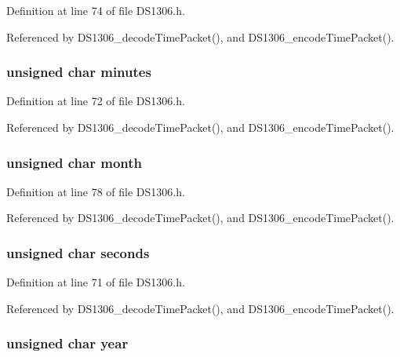 Definition at line 74 of file D\-S1306.\-h.



Referenced by D\-S1306\-\_\-decode\-Time\-Packet(), and D\-S1306\-\_\-encode\-Time\-Packet().

\hypertarget{structds1306time_acf4ceb0d1cb80a37559ed7fd414cd389}{
\subsubsection[{minutes}]{\setlength{\rightskip}{0pt plus 5cm}unsigned char minutes}}\label{structds1306time_acf4ceb0d1cb80a37559ed7fd414cd389}


Definition at line 72 of file D\-S1306.\-h.



Referenced by D\-S1306\-\_\-decode\-Time\-Packet(), and D\-S1306\-\_\-encode\-Time\-Packet().

\hypertarget{structds1306time_a4900720b55a67c901372712af062d615}{
\subsubsection[{month}]{\setlength{\rightskip}{0pt plus 5cm}unsigned char month}}\label{structds1306time_a4900720b55a67c901372712af062d615}


Definition at line 78 of file D\-S1306.\-h.



Referenced by D\-S1306\-\_\-decode\-Time\-Packet(), and D\-S1306\-\_\-encode\-Time\-Packet().

\hypertarget{structds1306time_a173027d8c297c3e800a19ec32217953e}{
\subsubsection[{seconds}]{\setlength{\rightskip}{0pt plus 5cm}unsigned char seconds}}\label{structds1306time_a173027d8c297c3e800a19ec32217953e}


Definition at line 71 of file D\-S1306.\-h.



Referenced by D\-S1306\-\_\-decode\-Time\-Packet(), and D\-S1306\-\_\-encode\-Time\-Packet().

\hypertarget{structds1306time_a189605ebe7fb094d2d8d511d855c4bb0}{
\subsubsection[{year}]{\setlength{\rightskip}{0pt plus 5cm}unsigned char year}}\label{structds1306time_a189605ebe7fb094d2d8d511d855c4bb0}


